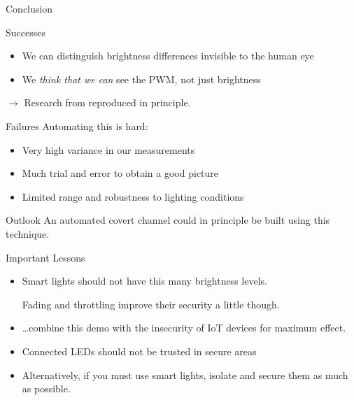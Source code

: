 \documentclass[11pt,t,usepdftitle=false,aspectratio=169]{beamer}
\begin{document}
\begin{frame}{Conclusion} %
	\begin{block}{Successes}
		\begin{itemize}
			\item We can distinguish brightness differences invisible to the human eye
			\item We \emph{think that we can} see the PWM, not just brightness
		\end{itemize}
		$\rightarrow$ Research from \cite{Ronen:2016:EFAIDCSL} reproduced in principle.
	\end{block}

	\pause
	\begin{alertblock}{Failures}
		Automating this is hard:
		\begin{itemize}
			\item Very high variance in our measurements
			\item Much trial and error to obtain a good picture
			\item Limited range and robustness to lighting conditions
		\end{itemize}
	\end{alertblock}
\end{frame}

\begin{frame}{Outlook} %
	An automated covert channel could in principle be built using this technique.

	\begin{block}{Important Lessons}
		\begin{itemize}
			\item Smart lights should not have this many brightness levels.

				Fading and throttling improve their security a little though.
			\item \ldots combine this demo with the insecurity of IoT devices for maximum effect.
			\item Connected LEDs should not be trusted in secure areas
			\item Alternatively, if you must use smart lights, isolate and secure them as much as possible.
		\end{itemize}
	\end{block}

\end{frame}
\end{document}
